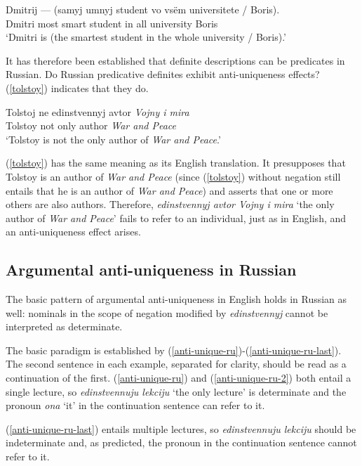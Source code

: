 \begin{exe}
	\ex \label{dmitri-boris} \gll Dmitrij --- (samyj umnyj student vo vs\"{e}m universitete / Boris).\\
	Dmitri {} most smart student in all university {} Boris\\
	\glt `Dmitri is (the smartest student in the whole university / Boris).'
\end{exe}

It has therefore been established that definite descriptions can be predicates in Russian. Do Russian predicative definites exhibit anti-uniqueness effects? (\ref{tolstoy}) indicates that they do.

\begin{exe}
	\ex \label{tolstoy} \gll Tolstoj ne edinstvennyj avtor \textit{Vojny i mira}\\
	Tolstoy not only author \textit{War and Peace}\\
	\glt `Tolstoy is not the only author of \textit{War and Peace}.'
\end{exe}

(\ref{tolstoy}) has the same meaning as its English translation. It presupposes that Tolstoy is an author of \textit{War and Peace} (since (\ref{tolstoy}) without negation still entails that he is an author of \textit{War and Peace}) and asserts that one or more others are also authors. Therefore, \textit{edinstvennyj avtor Vojny i mira} `the only author of \textit{War and Peace}' fails to refer to an individual, just as in English, and an anti-uniqueness effect arises.

\subsection{Argumental anti-uniqueness in Russian}
The basic pattern of argumental anti-uniqueness in English holds in Russian as well: nominals in the scope of negation modified by \textit{edinstvennyj} cannot be interpreted as determinate.

The basic paradigm is established by (\ref{anti-unique-ru})-(\ref{anti-unique-ru-last}). The second sentence in each example, separated for clarity, should be read as a continuation of the first. (\ref{anti-unique-ru}) and (\ref{anti-unique-ru-2}) both entail a single lecture, so \textit{edinstvennuju lekciju} `the only lecture' is determinate and the pronoun \textit{ona} `it' in the continuation sentence can refer to it.

(\ref{anti-unique-ru-last}) entails multiple lectures, so \textit{edinstvennuju lekciju} should be indeterminate and, as predicted, the pronoun in the continuation sentence cannot refer to it.

